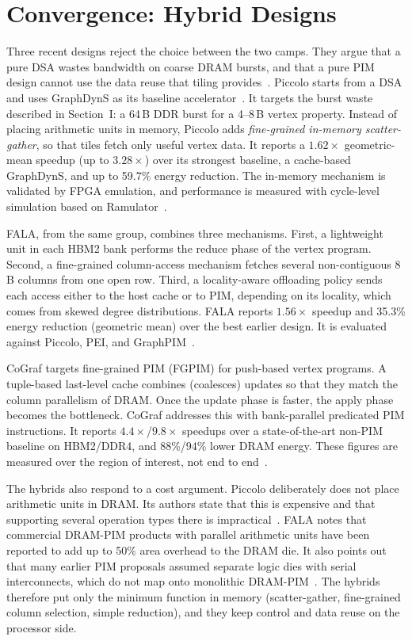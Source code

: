 \documentclass[journal,onecolumn]{IEEEtran}
\begin{document}
\section{Convergence: Hybrid Designs}\label{sec:hybrid}
Three recent designs reject the choice between the two camps. They argue that a pure DSA wastes bandwidth on coarse DRAM bursts, and that a pure PIM design cannot use the data reuse that tiling provides~\cite{shin2025piccolo,shin2025fala}. Piccolo starts from a DSA and uses GraphDynS as its baseline accelerator~\cite{shin2025piccolo}. It targets the burst waste described in Section~I: a 64\,B DDR burst for a 4--8\,B vertex property. Instead of placing arithmetic units in memory, Piccolo adds \emph{fine-grained in-memory scatter-gather}, so that tiles fetch only useful vertex data. It reports a $1.62\times$ geometric-mean speedup (up to $3.28\times$) over its strongest baseline, a cache-based GraphDynS, and up to 59.7\% energy reduction. The in-memory mechanism is validated by FPGA emulation, and performance is measured with cycle-level simulation based on Ramulator~\cite{shin2025piccolo}.

FALA, from the same group, combines three mechanisms. First, a lightweight unit in each HBM2 bank performs the reduce phase of the vertex program. Second, a fine-grained column-access mechanism fetches several non-contiguous 8\,B columns from one open row. Third, a locality-aware offloading policy sends each access either to the host cache or to PIM, depending on its locality, which comes from skewed degree distributions. FALA reports $1.56\times$ speedup and 35.3\% energy reduction (geometric mean) over the best earlier design. It is evaluated against Piccolo, PEI, and GraphPIM~\cite{shin2025fala}.

CoGraf targets fine-grained PIM (FGPIM) for push-based vertex programs. A tuple-based last-level cache combines (coalesces) updates so that they match the column parallelism of DRAM. Once the update phase is faster, the apply phase becomes the bottleneck. CoGraf addresses this with bank-parallel predicated PIM instructions. It reports $4.4\times$/$9.8\times$ speedups over a state-of-the-art non-PIM baseline on HBM2/DDR4, and 88\%/94\% lower DRAM energy. These figures are measured over the region of interest, not end to end~\cite{yenimol2026cograf}.

The hybrids also respond to a cost argument. Piccolo deliberately does not place arithmetic units in DRAM. Its authors state that this is expensive and that supporting several operation types there is impractical~\cite{shin2025piccolo}. FALA notes that commercial DRAM-PIM products with parallel arithmetic units have been reported to add up to 50\% area overhead to the DRAM die. It also points out that many earlier PIM proposals assumed separate logic dies with serial interconnects, which do not map onto monolithic DRAM-PIM~\cite{shin2025fala}. The hybrids therefore put only the minimum function in memory (scatter-gather, fine-grained column selection, simple reduction), and they keep control and data reuse on the processor side.
\end{document}
